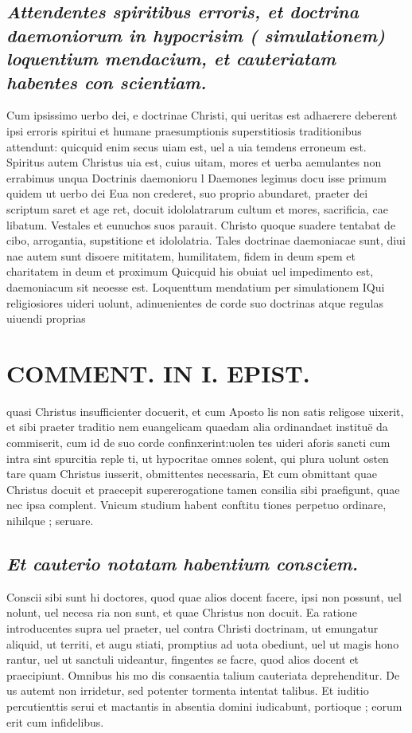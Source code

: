 \documentclass{article}
\begin{document}
\begin{pages}
\subsection*{\textit{Attendentes spiritibus erroris, et doctrina daemoniorum in hypocrisim ( simulationem) loquentium mendacium, et cauteriatam habentes con scientiam. }}\pstart Cum ipsissimo uerbo dei, e doctrinae Christi, qui ueritas est adhaerere deberent ipsi erroris spiritui et humane praesumptionis superstitiosis traditionibus attendunt: quicquid enim secus uiam est, uel a uia temdens erroneum est. Spiritus autem Christus uia est, cuius uitam, mores et uerba aemulantes non errabimus unqua  \pend\pstart Doctrinis daemonioru l Daemones legimus docu isse primum quidem ut uerbo dei Eua non crederet, suo proprio abundaret, praeter dei scriptum saret et age ret, docuit idololatrarum cultum et mores, sacrificia, cae libatum. Vestales et eunuchos suos parauit. Christo quoque suadere tentabat de cibo, arrogantia, supstitione et idololatria. Tales doctrinae daemoniacae sunt, diui nae autem sunt disoere mititatem, humilitatem, fidem in deum spem et charitatem in deum et proximum Quicquid his obuiat uel impedimento est, daemoniacum sit neoesse est.  \pend\pstart Loquenttum mendatium per simulationem IQui religiosiores uideri uolunt, adinuenientes de corde suo doctrinas atque regulas uiuendi proprias  \pend
\section*{COMMENT. IN I. EPIST. }
\marginpar{[ p.96 ]}\pstart quasi Christus insufficienter docuerit, et cum Aposto lis non satis religose uixerit, et sibi praeter traditio nem euangelicam quaedam alia ordinandaet instituë da commiserit, cum id de suo corde confinxerint:uolen tes uideri aforis sancti cum intra sint spurcitia reple ti, ut hypocritae omnes solent, qui plura uolunt osten tare quam Christus iusserit, obmittentes necessaria, Et cum obmittant quae Christus docuit et praecepit supererogatione tamen consilia sibi praefigunt, quae nec ipsa complent. Vnicum studium habent conftitu tiones perpetuo ordinare, nihilque ; seruare.  \pend
{}
{}
\subsection*{\textit{Et cauterio notatam habentium consciem. }}\pstart Conscii sibi sunt hi doctores, quod quae alios docent facere, ipsi non possunt, uel nolunt, uel necesa ria non sunt, et quae Christus non docuit. Ea ratione introducentes supra uel praeter, uel contra Christi doctrinam, ut emungatur aliquid, ut territi, et augu stiati, promptius ad uota obediunt, uel ut magis hono rantur, uel ut sanctuli uideantur, fingentes se facre, quod alios docent et praecipiunt. Omnibus his mo dis consaentia talium cauteriata deprehenditur. De us autemt non irridetur, sed potenter tormenta intentat talibus. Et iuditio percutienttis serui et mactantis in absentia domini iudicabunt, portioque ; eorum erit cum infidelibus.  \pend

\end{pages}
\end{document}
